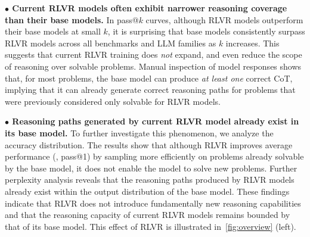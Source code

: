 \textbf{$\bullet$ Current RLVR models often exhibit narrower reasoning coverage than their base models.}
In pass@$k$ curves, although RLVR models outperform their base models at small $k$, it is surprising that base models consistently surpass RLVR models across all benchmarks and LLM families as $k$ increases. 
This suggests that current RLVR training does \emph{not} expand, and even reduce the scope of reasoning over solvable problems.
Manual inspection of model responses shows that, for most problems, the base model can produce \textit{at least one} correct CoT, implying that it can already generate correct reasoning paths for problems that were previously considered only solvable for RLVR models. 



\textbf{$\bullet$ Reasoning paths generated by current RLVR model already exist in its base model.}
To further investigate this phenomenon, we analyze the accuracy distribution.
The results show that although RLVR improves average performance (\ie, pass@1) by sampling more efficiently on problems already solvable by the base model, it does not enable the model to solve new problems.
Further perplexity analysis reveals that the reasoning paths produced by RLVR models already exist within the output distribution of the base model. 
These findings indicate that RLVR does not introduce fundamentally new reasoning capabilities and that the reasoning capacity of current RLVR models remains bounded by that of its base model.
This effect of RLVR is illustrated in~\cref{fig:overview} (left).


